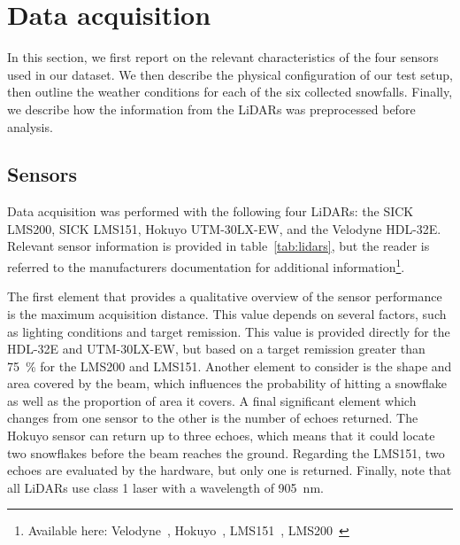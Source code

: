 \section{Data acquisition}
In this section, we first report on the relevant characteristics of the four sensors used in our dataset. We then describe the physical configuration of our test setup, then outline the weather conditions for each of the six collected snowfalls. Finally, we describe how the information from the LiDARs was preprocessed before analysis. 

\subsection{Sensors}

Data acquisition was performed with the following four LiDARs: the SICK LMS200, SICK LMS151, Hokuyo UTM-30LX-EW, and the Velodyne HDL-32E. Relevant sensor information is provided in table~\ref{tab:lidars}, but the reader is referred to the manufacturers documentation for additional information\footnote{Available here: Velodyne~\cite{VelodyneManual}, Hokuyo~\cite{UTMDatasheet}, LMS151~\cite{LMS151Datasheet}, LMS200~\cite{LMS200Manual}}.

The first element that provides a qualitative overview of the sensor performance is the maximum acquisition distance. This value depends on several factors, such as lighting conditions and target remission. This value is provided directly for the HDL-32E and UTM-30LX-EW, but based on a target remission greater than \SI{75}{\percent} for the LMS200 and LMS151. Another element to consider is the shape and area covered by the beam, which influences the probability of hitting a snowflake as well as the proportion of area it covers. A final significant element which changes from one sensor to the other is the number of echoes returned. The Hokuyo sensor can return up to three echoes, which means that it could locate two snowflakes before the beam reaches the ground. Regarding the LMS151, two echoes are evaluated by the hardware, but only one is returned. Finally, note that all LiDARs use class 1 laser with a wavelength of \SI{905}{\nano\meter}.

